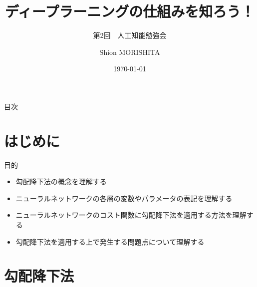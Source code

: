 \documentclass[dvipdfmx,aspectratio=169]{beamer}
\title{ディープラーニングの仕組みを知ろう！}
\subtitle{第2回　人工知能勉強会}
\author{Shion MORISHITA}
\institute{}
\date{\today}
\begin{document}
	\begin{frame}[plain]
	    \maketitle
	\end{frame}
		
	\begin{frame}[shrink]{目次}
		\vspace{1em}
		\tableofcontents
	\end{frame}
	
	\section{はじめに}
	\begin{frame}{目的}
		\begin{itemize}
			\item 勾配降下法の概念を理解する
			\item ニューラルネットワークの各層の変数やパラメータの表記を理解する
			\item ニューラルネットワークのコスト関数に勾配降下法を適用する方法を理解する
			\item 勾配降下法を適用する上で発生する問題点について理解する
		\end{itemize}
	\end{frame}

	\section{勾配降下法}
\end{document}
